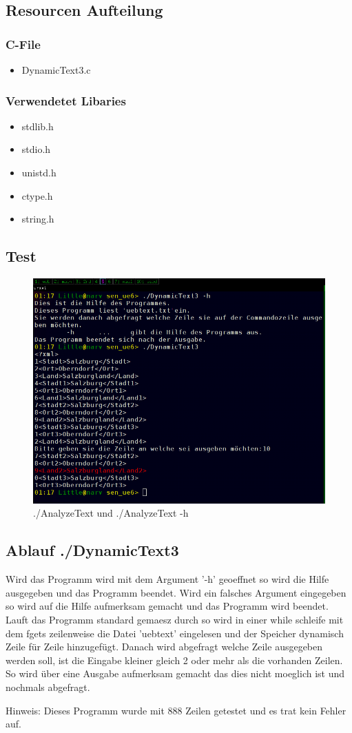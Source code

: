 \documentclass{scrartcl}
\begin{document}
\subsection{Resourcen Aufteilung}
\subsubsection{C-File}
\begin{itemize}
\item DynamicText3.c
\end{itemize}
\subsubsection{Verwendetet Libaries}
\begin{itemize}
\item stdlib.h
\item stdio.h
\item unistd.h
\item ctype.h
\item string.h
\end{itemize}
\subsection{Test}
\begin{figure}[H]
  \centering
  \includegraphics[width=0.9\linewidth]{images/Test_DynamicText.png}
  \caption{./AnalyzeText und ./AnalyzeText -h}
  \label{fig:digraph}
\end{figure}
\subsection{Ablauf ./DynamicText3}
Wird das Programm wird mit dem Argument '-h' geoeffnet so wird die Hilfe ausgegeben und das Programm beendet. Wird ein falsches Argument eingegeben so wird auf die Hilfe aufmerksam gemacht und das Programm wird beendet. Lauft das Programm standard gemaesz durch so wird in einer while schleife mit dem fgets zeilenweise die Datei 'uebtext' eingelesen und der Speicher dynamisch Zeile für Zeile hinzugefügt. Danach wird abgefragt welche Zeile ausgegeben werden soll, ist die Eingabe kleiner gleich 2 oder mehr als die vorhanden Zeilen. So wird über eine Ausgabe aufmerksam gemacht das dies nicht moeglich ist und nochmals abgefragt.

Hinweis: Dieses Programm wurde mit 888 Zeilen getestet und es trat kein Fehler auf.
\end{document}
